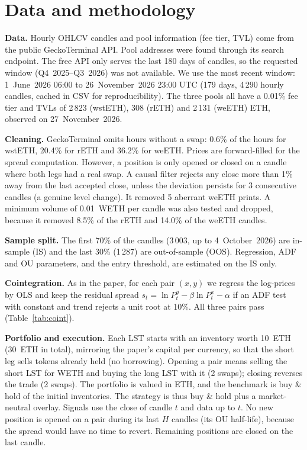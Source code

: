 \documentclass[10pt,a4paper]{article}
\begin{document}
\section{Data and methodology}

\textbf{Data.} Hourly OHLCV candles and pool information (fee tier, TVL) come from the
public GeckoTerminal API. Pool addresses were found through its search endpoint. The free
API only serves the last 180 days of candles, so the requested window (Q4~2025--Q3~2026)
was not available. We use the most recent window: 1~June~2026 06:00 to
26~November~2026 23:00 UTC (179 days, 4\,290 hourly candles, cached in CSV for
reproducibility). The three pools all have a 0.01\% fee tier and TVLs of 2\,823 (wstETH),
308 (rETH) and 2\,131 (weETH) ETH, observed on 27~November~2026.

\textbf{Cleaning.} GeckoTerminal omits hours without a swap: 0.6\% of the hours for
wstETH, 20.4\% for rETH and 36.2\% for weETH. Prices are forward-filled for the spread
computation. However, a position is only opened or closed on a candle where both legs
had a real swap. A causal filter rejects any close more than 1\% away from the last
accepted close, unless the deviation persists for 3 consecutive candles (a genuine level
change). It removed 5 aberrant weETH prints. A minimum volume of 0.01~WETH per candle was
also tested and dropped, because it removed 8.5\% of the rETH and 14.0\% of the weETH
candles.

\textbf{Sample split.} The first 70\% of the candles (3\,003, up to 4~October~2026) are
in-sample (IS) and the last 30\% (1\,287) are out-of-sample (OOS). Regression, ADF and OU
parameters, and the entry threshold, are estimated on the IS only.

\textbf{Cointegration.} As in the paper, for each pair $(x,y)$ we regress the log-prices
by OLS and keep the residual spread
$s_t=\ln P^y_t-\beta\ln P^x_t-\alpha$ if an ADF test with constant and trend rejects a
unit root at 10\%. All three pairs pass (Table~\ref{tab:coint}).

\textbf{Portfolio and execution.} Each LST starts with an inventory worth 10~ETH (30~ETH
in total), mirroring the paper's capital per currency, so that the short leg sells tokens
already held (no borrowing). Opening a pair means selling the short LST for WETH and
buying the long LST with it (2 swaps); closing reverses the trade (2 swaps). The
portfolio is valued in ETH, and the benchmark is buy \& hold of the initial inventories.
The strategy is thus buy \& hold plus a market-neutral overlay. Signals use the close of
candle $t$ and data up to $t$. No new position is opened on a pair during its last $H$
candles (its OU half-life), because the spread would have no time to revert. Remaining
positions are closed on the last candle.
\end{document}
